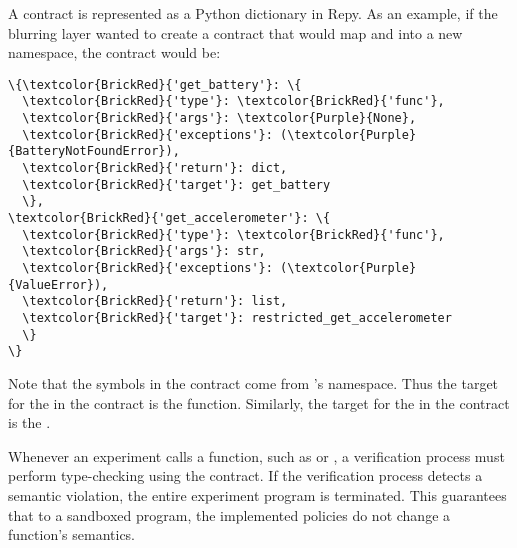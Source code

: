 A contract is represented as a Python dictionary in Repy. As an example, if 
the blurring layer  wanted to create a contract that would map
 and  into 
a new namespace, the contract would be: 

\begin{Verbatim}
\{\textcolor{BrickRed}{'get_battery'}: \{
  \textcolor{BrickRed}{'type'}: \textcolor{BrickRed}{'func'},
  \textcolor{BrickRed}{'args'}: \textcolor{Purple}{None}, 
  \textcolor{BrickRed}{'exceptions'}: (\textcolor{Purple}{BatteryNotFoundError}), 
  \textcolor{BrickRed}{'return'}: dict,
  \textcolor{BrickRed}{'target'}: get_battery
  \}, 
\textcolor{BrickRed}{'get_accelerometer'}: \{
  \textcolor{BrickRed}{'type'}: \textcolor{BrickRed}{'func'},
  \textcolor{BrickRed}{'args'}: str, 
  \textcolor{BrickRed}{'exceptions'}: (\textcolor{Purple}{ValueError}), 
  \textcolor{BrickRed}{'return'}: list,
  \textcolor{BrickRed}{'target'}: restricted_get_accelerometer
  \}
\}
\end{Verbatim} 

Note that the symbols in the contract come from 's 
namespace. Thus the target for the  in the 
contract is the  function. Similarly, the 
target for the  in the contract is the 
.

Whenever an experiment calls a function, such as 
or , a verification process must perform 
type-checking using the contract. If the verification process 
detects a semantic violation,  the entire experiment program is 
terminated. This guarantees that to a sandboxed program, 
the implemented policies do not change a function's semantics.



